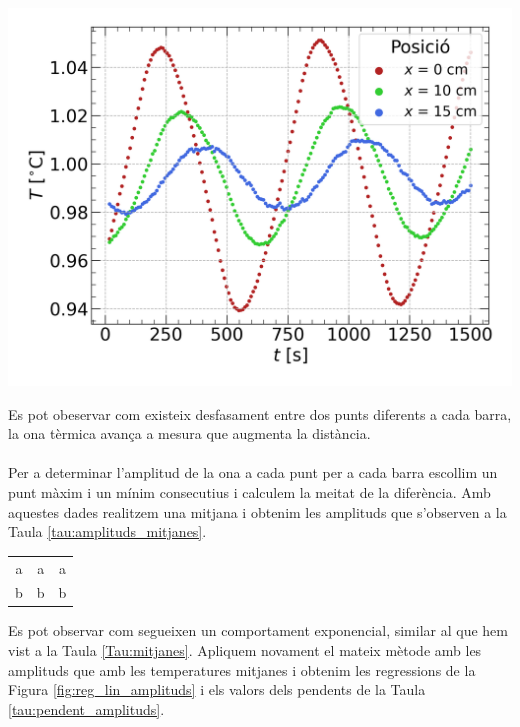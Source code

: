 \documentclass[12pt,twosides,onecolumn,openany]{article}
\newenvironment{Figura}
  {\par\medskip\noindent\minipage{\linewidth}}
  {\endminipage\par\medskip}
\begin{document}
\begin{multicols}{2}
\begin{Figura}
  \label{fig:T_vs_t_gran_norm}
\end{Figura}
\begin{Figura}
  \centering
  \includegraphics[width=1\linewidth]{../../graphs/practica_Ia/plots/petit_norm.png}
  \label{fig:T_vs_t_petita_norm}
\end{Figura}
Es pot obeservar com existeix desfasament entre dos punts diferents a cada barra, la ona tèrmica avança a mesura que augmenta la distància.\\\\
Per a determinar l'amplitud de la ona a cada punt per a cada barra escollim un punt màxim i un mínim consecutius i calculem la meitat de la diferència. Amb aquestes dades realitzem una mitjana i obtenim les amplituds que s'observen a la Taula \ref{tau:amplituds_mitjanes}.
\begin{Figura}
  \centering
  \begin{tabular}{c|c|c}
    a & a & a \\
    b & b & b 
  \end{tabular}
  \label{tau:amplituds_mitjanes}
\end{Figura} 
Es pot observar com segueixen un comportament exponencial, similar al que hem vist a la Taula \ref{Tau:mitjanes}. Apliquem novament el mateix mètode amb les amplituds que amb les temperatures mitjanes i obtenim les regressions de la Figura \ref{fig:reg_lin_amplituds} i els valors dels pendents de la Taula \ref{tau:pendent_amplituds}.


\end{multicols}
\end{document}
